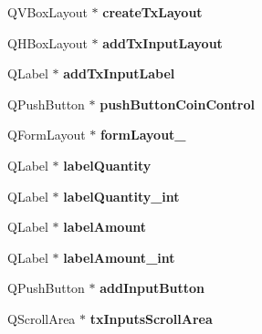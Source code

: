 \begin{DoxyCompactItemize}
Q\+V\+Box\+Layout $\ast$ {\bfseries create\+Tx\+Layout}
\item 
\mbox{\label{class_ui___multisig_dialog_a66ede5d24af25d8bf811a21d607438b8}} 
Q\+H\+Box\+Layout $\ast$ {\bfseries add\+Tx\+Input\+Layout}
\item 
\mbox{\label{class_ui___multisig_dialog_a4c44cda83eba90e7141cedf44ebe7e81}} 
Q\+Label $\ast$ {\bfseries add\+Tx\+Input\+Label}
\item 
\mbox{\label{class_ui___multisig_dialog_adce133eb1a91cb29b77582ebab902427}} 
Q\+Push\+Button $\ast$ {\bfseries push\+Button\+Coin\+Control}
\item 
\mbox{\label{class_ui___multisig_dialog_a4a031417e0b51b615a1af8a75b188941}} 
Q\+Form\+Layout $\ast$ {\bfseries form\+Layout\+\_}
\item 
\mbox{\label{class_ui___multisig_dialog_afeeb60ad9aef8d54ebfc2fe2c9690846}} 
Q\+Label $\ast$ {\bfseries label\+Quantity}
\item 
\mbox{\label{class_ui___multisig_dialog_ada206dd08e616c603efdca800a676f42}} 
Q\+Label $\ast$ {\bfseries label\+Quantity\+\_\+int}
\item 
\mbox{\label{class_ui___multisig_dialog_a47d24a842a267bd56b44bdb997eb5cae}} 
Q\+Label $\ast$ {\bfseries label\+Amount}
\item 
\mbox{\label{class_ui___multisig_dialog_a5913239572e173b453530d337dc61549}} 
Q\+Label $\ast$ {\bfseries label\+Amount\+\_\+int}
\item 
\mbox{\label{class_ui___multisig_dialog_abd470dabee6dd33a7690d10d5446b083}} 
Q\+Push\+Button $\ast$ {\bfseries add\+Input\+Button}
\item 
\mbox{\label{class_ui___multisig_dialog_a95c19c8bb92acffea3a644f879eff8e8}} 
Q\+Scroll\+Area $\ast$ {\bfseries tx\+Inputs\+Scroll\+Area}
\item 

\end{DoxyCompactItemize}
